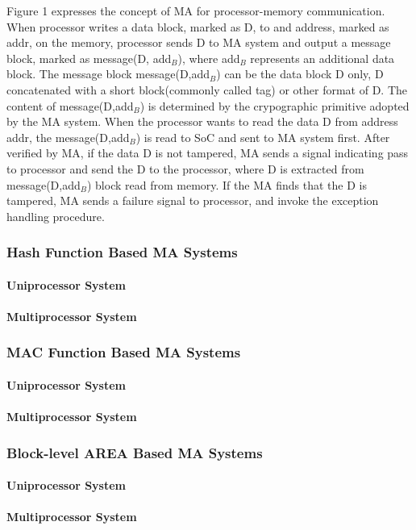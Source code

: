 \documentclass{article}
\begin{document}
Figure 1 expresses the concept of MA for processor-memory communication. 
When processor writes a data block, marked as D, to and address, marked as addr, on the memory, processor sends D to MA system and output a message block, marked as message(D, add$_B$), where add$_B$ represents an additional data block. The message block message(D,add$_B$) can be the data block D only, D concatenated with a short block(commonly called tag) or other format of D. The content of message(D,add$_B$) is determined by the crypographic primitive adopted by the MA system.
When the processor wants to read the data D from address addr, the message(D,add$_B$) is read to SoC and sent to MA system first. After verified by MA, if the data D is not tampered, MA sends a signal indicating pass to processor and send the D to the processor, where D is extracted from message(D,add$_B$) block read from memory.
If the MA finds that the D is tampered, MA sends a failure signal to processor, and invoke the exception handling procedure.
\subsubsection{Hash Function Based MA Systems}
\paragraph{Uniprocessor System}
\paragraph{Multiprocessor System}
\subsubsection{MAC Function Based MA Systems}
\paragraph{Uniprocessor System}
\paragraph{Multiprocessor System}
\subsubsection{Block-level AREA Based MA Systems}
\paragraph{Uniprocessor System}
\paragraph{Multiprocessor System}



\end{document}
